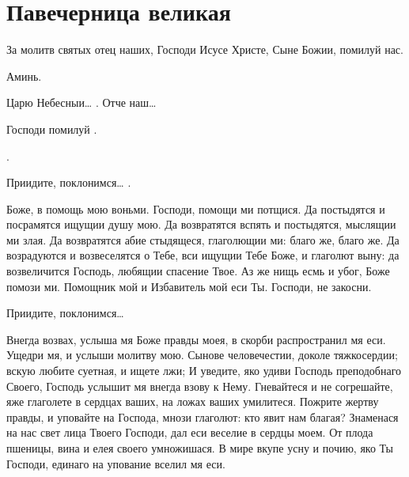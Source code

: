 \section{Павечерница великая}\begin{mymulticols}






За молитв святых отец наших, Господи Исусе Христе, Сыне Божии, помилуй нас.

Аминь.

Царю Небесныи… .  Отче наш… 


Господи помилуй .

. 

Приидите, поклонимся… .




Боже, в помощь мою воньми. Господи, помощи ми потщися. Да постыдятся и посрамятся ищущии душу мою. Да возвратятся вспять и постыдятся, мыслящии ми злая. Да возвратятся абие стыдящеся, глаголющии ми: благо же, благо же. Да возрадуются и возвеселятся о Тебе, вси ищущии Тебе Боже, и глаголют выну: да возвеличится Господь, любящии спасение Твое. Аз же нищь есмь и убог, Боже помози ми. Помощник мой и Избавитель мой еси Ты. Господи, не закосни.



 Приидите, поклонимся… 

Внегда возвах, услыша мя Боже правды моея, в скорби распространил мя еси. Ущедри мя, и услыши молитву мою. Сынове человечестии, доколе тяжкосердии; вскую любите суетная, и ищете лжи; И уведите, яко удиви Господь преподобнаго Своего, Господь услышит мя внегда взову к Нему. Гневайтеся и не согрешайте, яже глаголете в сердцах ваших, на ложах ваших умилитеся. Пожрите жертву правды, и уповайте на Господа, мнози глаголют: кто явит нам благая? Знаменася на нас свет лица Твоего Господи, дал еси веселие в сердцы моем. От плода пшеницы, вина и елея своего умножишася. В мире вкупе усну и почию, яко Ты Господи, единаго на упование вселил мя еси.



\end{mymulticols}
